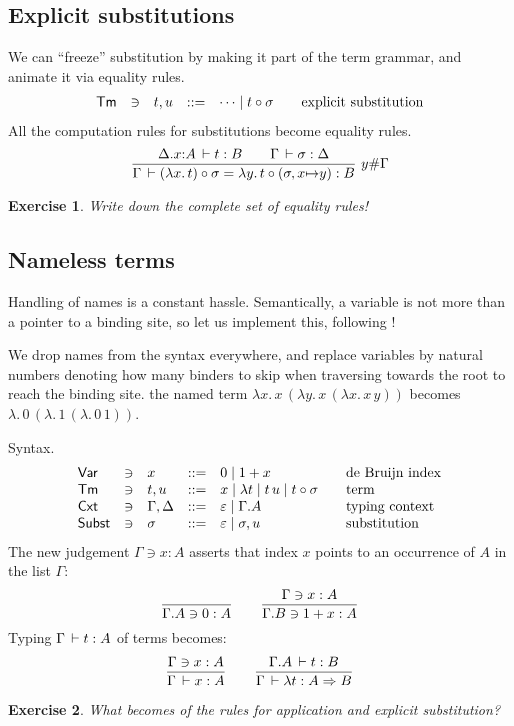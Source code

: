 \documentclass[a4paper,fleqn]{scrartcl}
\newtheorem{exercise}{Exercise}
\newcommand{\Var}{\mathsf{Var}}
\newcommand{\Tm}{\mathsf{Tm}}
\newcommand{\Cxt}{\mathsf{Cxt}}
\newcommand{\Subst}{\mathsf{Subst}}
\begin{document}
\subsection{Explicit substitutions}

We can ``freeze'' substitution by making it part of the term grammar,
and animate it via equality rules.
\[
\begin{array}{lllrl@{\qquad}l}
\Tm & \ni & t,u & ::= & \dots \mid t \comp \Gs
  & \mbox{explicit substitution} \\
\end{array}
\]
All the computation rules for substitutions become equality rules.
\[
\dfrac{\Delta.x{:}A \,\vdash t : B \qquad \Gamma \,\vdash \sigma : \Delta
   }{\Gamma \,\vdash (\lambda x.\,t) \circ \sigma
              = \lambda y.\,t \circ (\sigma,x{\mapsto}y) : B
   }\ y \# \Gamma
\]
\begin{exercise}
Write down the complete set of equality rules!
\end{exercise}


\subsection{Nameless terms}

Handling of names is a constant hassle.  Semantically, a variable is
not more than a pointer to a binding site, so let us implement this,
following \textcite{Bruijn72}!

We drop names from the syntax everywhere, and replace variables by
natural numbers denoting how many binders to skip when traversing
towards the root to reach the binding site. \Eg the named term
$\lambda x.\,x\,(\lambda y.\,x\,(\lambda x.\,x\,y))$ becomes
$\lambda.\,0\,(\lambda.\,1\,(\lambda.\,0\,1))$.

Syntax.
\[
\begin{array}{lllrl@{\qquad}l}
\Var & \ni & x & ::= & 0 \mid 1 + x & \mbox{de Bruijn index} \\
\Tm & \ni & t,u & ::= & x \mid \lambda t \mid t \, u \mid t \comp \Gs & \mbox{term}
  \\
\Cxt & \ni & \Gamma,\Delta & ::= & \varepsilon \mid \Gamma.A
  & \mbox{typing context}\\
\Subst & \ni & \sigma & ::= & \varepsilon \mid \sigma,u
  & \mbox{substitution} \\
\end{array}
\]
The new judgement $\Gamma \ni x : A$ asserts that index $x$ points to an occurrence of $A$ in the list $\Gamma$:
\[
  \dfrac{}{\Gamma.A \ni 0 : A}
\qquad
  \dfrac{\Gamma \ni x : A}{\Gamma.B \ni 1 + x : A}
\]
Typing $\Gamma \,\vdash t : A$ of terms becomes:
\[
  \dfrac{\Gamma \ni x : A}{\Gamma \,\vdash x : A}
\qquad
  \dfrac{\Gamma.A \,\vdash t : B
    }{\Gamma \,\vdash \lambda t : A \Rightarrow B}
\]
\begin{exercise}
What becomes of the rules for application and explicit substitution?
\end{exercise}
\end{document}
